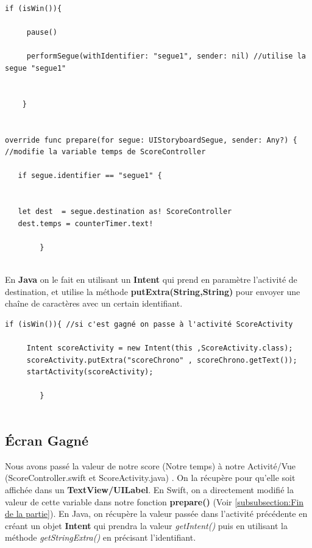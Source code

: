 \documentclass{article}
\begin{document}
\begin{verbatim}
if (isWin()){
            
     pause()
            
     performSegue(withIdentifier: "segue1", sender: nil) //utilise la segue "segue1"
            
            
    }
        

override func prepare(for segue: UIStoryboardSegue, sender: Any?) { 
//modifie la variable temps de ScoreController 

   if segue.identifier == "segue1" {
            
            
   let dest  = segue.destination as! ScoreController
   dest.temps = counterTimer.text!
            
        }
    

\end{verbatim}

En \textbf{Java} on le fait en utilisant un \textbf{Intent} qui prend en paramètre l'activité de destination, et utilise la méthode \textbf{putExtra(String,String)} pour envoyer une chaîne de caractères avec un certain identifiant.  

\begin{verbatim}
if (isWin()){ //si c'est gagné on passe à l'activité ScoreActivity

     Intent scoreActivity = new Intent(this ,ScoreActivity.class);
     scoreActivity.putExtra("scoreChrono" , scoreChrono.getText()); 
     startActivity(scoreActivity);

        }


\end{verbatim}





\subsection{Écran Gagné}

Nous avons passé la valeur de notre score (Notre temps) à notre Activité/Vue (ScoreController.swift et ScoreActivity.java) . On la récupère pour qu'elle soit affichée dans un \textbf{TextView/UILabel}. En Swift, on a directement modifié la valeur de cette variable dans notre fonction \textbf{prepare()}  (Voir \ref{subsubsection:Fin de la partie}). En Java, on récupère la valeur passée dans l'activité précédente en créant un objet \textbf{Intent} qui prendra la valeur \textit{getIntent()} puis en utilisant la méthode \textit{getStringExtra()} en précisant l'identifiant. 
\end{document}
